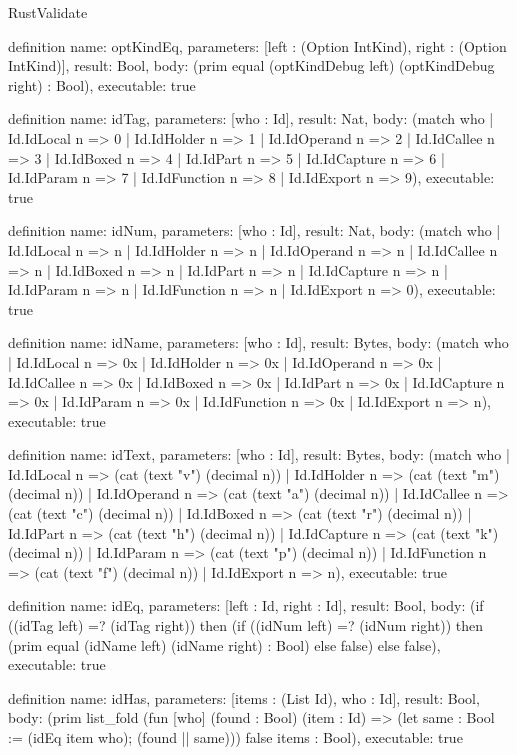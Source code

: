 \begin{lexlean}{RustValidate}
\begin{semanticmodule}
definition{
  name: optKindEq,
  parameters: [left : (Option IntKind), right : (Option IntKind)],
  result: Bool,
  body: (prim equal (optKindDebug left) (optKindDebug right) : Bool),
  executable: true
}

definition{
  name: idTag,
  parameters: [who : Id],
  result: Nat,
  body: (match who
    | Id.IdLocal n => 0
    | Id.IdHolder n => 1
    | Id.IdOperand n => 2
    | Id.IdCallee n => 3
    | Id.IdBoxed n => 4
    | Id.IdPart n => 5
    | Id.IdCapture n => 6
    | Id.IdParam n => 7
    | Id.IdFunction n => 8
    | Id.IdExport n => 9),
  executable: true
}

definition{
  name: idNum,
  parameters: [who : Id],
  result: Nat,
  body: (match who
    | Id.IdLocal n => n
    | Id.IdHolder n => n
    | Id.IdOperand n => n
    | Id.IdCallee n => n
    | Id.IdBoxed n => n
    | Id.IdPart n => n
    | Id.IdCapture n => n
    | Id.IdParam n => n
    | Id.IdFunction n => n
    | Id.IdExport n => 0),
  executable: true
}

definition{
  name: idName,
  parameters: [who : Id],
  result: Bytes,
  body: (match who
    | Id.IdLocal n => 0x
    | Id.IdHolder n => 0x
    | Id.IdOperand n => 0x
    | Id.IdCallee n => 0x
    | Id.IdBoxed n => 0x
    | Id.IdPart n => 0x
    | Id.IdCapture n => 0x
    | Id.IdParam n => 0x
    | Id.IdFunction n => 0x
    | Id.IdExport n => n),
  executable: true
}

definition{
  name: idText,
  parameters: [who : Id],
  result: Bytes,
  body: (match who
    | Id.IdLocal n => (cat (text "v") (decimal n))
    | Id.IdHolder n => (cat (text "m") (decimal n))
    | Id.IdOperand n => (cat (text "a") (decimal n))
    | Id.IdCallee n => (cat (text "c") (decimal n))
    | Id.IdBoxed n => (cat (text "r") (decimal n))
    | Id.IdPart n => (cat (text "h") (decimal n))
    | Id.IdCapture n => (cat (text "k") (decimal n))
    | Id.IdParam n => (cat (text "p") (decimal n))
    | Id.IdFunction n => (cat (text "f") (decimal n))
    | Id.IdExport n => n),
  executable: true
}

definition{
  name: idEq,
  parameters: [left : Id, right : Id],
  result: Bool,
  body: (if ((idTag left) =? (idTag right)) then (if ((idNum left) =? (idNum right)) then (prim equal (idName left) (idName right) : Bool) else false) else false),
  executable: true
}

definition{
  name: idHas,
  parameters: [items : (List Id), who : Id],
  result: Bool,
  body: (prim list_fold (fun [who] (found : Bool) (item : Id) => (let same : Bool := (idEq item who); (found || same))) false items : Bool),
  executable: true
}


\end{semanticmodule}
\end{lexlean}

